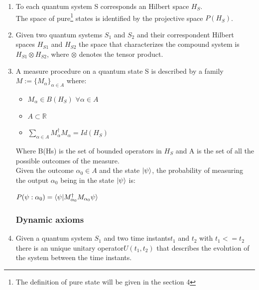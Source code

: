 \documentclass{article}
\begin{document}
\begin{enumerate}
	\item To each quantum system S corresponds an Hilbert space $H_S$.\\
	      The space of pure\footnote{The definition of pure state will
		      be given in the section 4}
	      states is identified by the projective space $P(H_S)$.

	\item Given two quantum systems $S_1$ and $S_2$ and their correspondent
	      Hilbert spaces $H_{S1}$ and $H_{S2}$ the space that characterizes the
	      compound system is $H_{S1} \otimes H_{S2}$, where $\otimes$ denotes
	      the tensor product.

	\item A measure procedure on a quantum state S is described
	      by a family \\  $M := \{M_\alpha \}_{\alpha\in A}$ where:

	      \begin{itemize}
		      \item $M_\alpha \in B(H_S) $ $ \forall \alpha \in A$
		      \item $A \subset \mathbb{R}$
		      \item $\sum_{\alpha \in A} M_\alpha^\dag M_\alpha = Id(H_S)$
	      \end{itemize}

	      Where B(Hs) is the set of bounded operators in $H_S$ and A is the
	      set of all the possible outcomes of the measure.\\
	      Given the outcome $\alpha_0 \in A$ and the state $\ket{\psi}$,
	      the probability
	      of measuring the output $\alpha_0$ being in the state $\ket{\psi}$
	      is:
	      \begin{center}
		      $P(\psi : \alpha_0) = \braket{\psi|M_{\alpha_0}^\dag M_{\alpha_0}\psi}$

	      \end{center}


	      \subsubsection{Dynamic axioms}


	\item Given a quantum system $S_1$ and two time instants$ t_1$ and $t_2$
	      with $t_1<=t_2$ there is an unique unitary operator$U(t_1,t_2)$ that
	      describes the evolution of the system between the time instants.


\end{enumerate}
\end{document}
